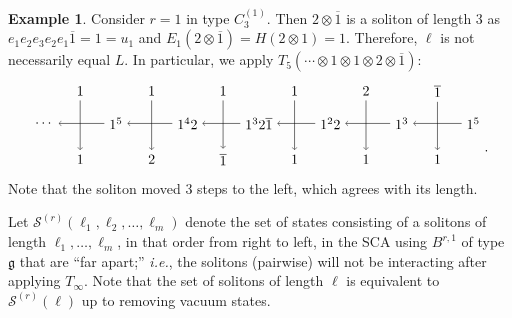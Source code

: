 \documentclass[reqno]{amsart}
\newcommand{\g}{\mathfrak{g}}
\newcommand{\Sol}{\mathcal{S}} %
\newcommand{\bon}{\overline{1}}
\theoremstyle{plain}
\theoremstyle{definition}
\newtheorem{ex}[thm]{Example}
\numberwithin{equation}{section}
\begin{document}
\begin{ex}
\label{ex:carrier_type_C}
Consider $r = 1$ in type $C_3^{(1)}$.
Then $2 \otimes \bon$ is a soliton of length $3$ as $e_1 e_2 e_3 e_2 e_1 \bon = 1 = u_1$ and $E_1(2 \otimes \bon) = H(2 \otimes 1) = 1$.
Therefore, $\ell$ is not necessarily equal $L$.
In particular, we apply $T_5(\cdots \otimes 1 \otimes 1 \otimes 2 \otimes \bon)$:
\[
\begin{tikzpicture}[baseline=-20,scale=0.9]
\node (u0) at (0,0) {$1^5$};
\node (u1) at (-2,0) {$1^3$};
\node (u2) at (-4,0) {$1^2 2$};
\node (u3) at (-6,0) {$1^3 2\bon$};
\node (u4) at (-8,0) {$1^4 2$};
\node (u5) at (-10,0) {$1^5$};
\node (u6) at (-12,0) {$\cdots$};
\node (b0) at (-1,0.9) {$\bon$};
\node (b-1) at (-3,0.9) {$2$};
\foreach \x in {-5, ..., -2} {
    \node (b\x) at (2*\x-1,0.9) {$1$};
}
\foreach \x in {-5, -2, -1, 0} {
    \node (bt\x) at (2*\x-1,-1) {$1$};
}
\node (bt-3) at (-7,-1) {$\bon$};
\node (bt-4) at (-9,-1) {$2$};
\foreach \x in {-5, ..., 0} {
    \draw[->] (b\x) -- (bt\x);
}
\foreach \x [evaluate=\x as \xm using {int(\x-1)}] in {1, ..., 6} {
    \draw[->] (u\xm) -- (u\x);
}
\end{tikzpicture}.
\]
Note that the soliton moved $3$ steps to the left, which agrees with its length.
\end{ex}

Let $\Sol^{(r)}(\ell_1, \ell_2, \dotsc, \ell_m)$ denote the set of states consisting of a solitons of length $\ell_1, \dotsc, \ell_m$, in that order from right to left, in the SCA using $B^{r,1}$ of type $\g$ that are ``far apart;'' \textit{i.e.}, the solitons (pairwise) will not be interacting after applying $T_{\infty}$.
Note that the set of solitons of length $\ell$ is equivalent to $\Sol^{(r)}(\ell)$ up to removing vacuum states.
\end{document}
